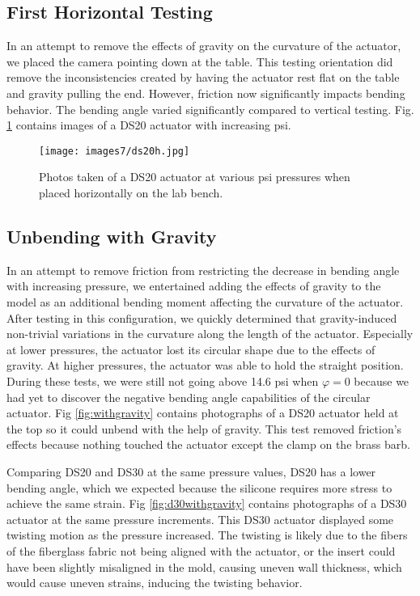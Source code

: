 \subsection{First Horizontal Testing}

In an attempt to remove the effects of gravity on the curvature of the actuator, we placed the camera pointing down at the table. This testing orientation did remove the inconsistencies created by having the actuator rest flat on the table and gravity pulling the end. However, friction now significantly impacts bending behavior. The bending angle varied significantly compared to vertical testing. Fig. \ref{fig:ds20h} contains images of a DS20 actuator with increasing psi. 

\begin{figure}[h]
    \centering
     \texttt{[image: images7/ds20h.jpg]}
    \caption{Photos taken of a DS20 actuator at various psi pressures when placed horizontally on the lab bench.}
    \label{fig:ds20h}
\end{figure}

\subsection{Unbending with Gravity}

In an attempt to remove friction from restricting the decrease in bending angle with increasing pressure, we entertained adding the effects of gravity to the model as an additional bending moment affecting the curvature of the actuator. After testing in this configuration, we quickly determined that gravity-induced non-trivial variations in the curvature along the length of the actuator. Especially at lower pressures, the actuator lost its circular shape due to the effects of gravity. At higher pressures, the actuator was able to hold the straight position. During these tests, we were still not going above 14.6 psi when $\varphi=0$ because we had yet to discover the negative bending angle capabilities of the circular actuator. Fig \ref{fig:withgravity} contains photographs of a DS20 actuator held at the top so it could unbend with the help of gravity. This test removed friction's effects because nothing touched the actuator except the clamp on the brass barb. 

Comparing DS20 and DS30 at the same pressure values, DS20 has a lower bending angle, which we expected because the silicone requires more stress to achieve the same strain. Fig \ref{fig:d30withgravity} contains photographs of a DS30 actuator at the same pressure increments. This DS30 actuator displayed some twisting motion as the pressure increased. The twisting is likely due to the fibers of the fiberglass fabric not being aligned with the actuator, or the insert could have been slightly misaligned in the mold, causing uneven wall thickness, which would cause uneven strains, inducing the twisting behavior.

